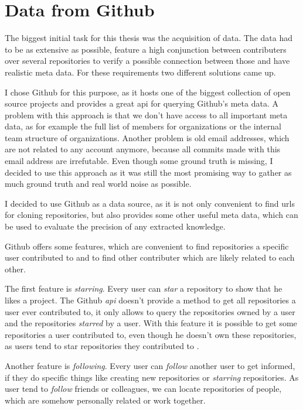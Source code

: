 \chapter{Data from Github}\label{github}
The biggest initial task for this thesis was the acquisition of data.
The data had to be as extensive as possible, feature a high conjunction between contributers over several repositories to verify a possible connection between those and have realistic meta data.
For these requirements two different solutions came up.


I chose Github for this purpose, as it hosts one of the biggest collection of open source projects and provides a great \ac{api} for querying Github's meta data.
A problem with this approach is that we don't have access to all important meta data, as for example the full list of members for organizations or the internal team structure of organizations.
Another problem is old email addresses, which are not related to any account anymore, because all commits made with this email address are irrefutable.
Even though some ground truth is missing, I decided to use this approach as it was still the most promising way to gather as much ground truth and real world noise as possible.


I decided to use Github as a data source, as it is not only convenient to find \acp{url} for cloning repositories, but also provides some other useful meta data, which can be used to evaluate the precision of any extracted knowledge.

Github offers some features, which are convenient to find repositories a specific user contributed to and to find other contributer which are likely related to each other.

The first feature is \emph{starring}. Every user can \emph{star} a repository to show that he likes a project.
The Github \emph{api} doesn't provide a method to get all repositories a user ever contributed to, it only allows to query the repositories owned by a user and the repositories \emph{starred} by a user.
With this feature it is possible to get some repositories a user contributed to, even though he doesn't own these repositories, as users tend to star repositories they contributed to .

Another feature is \emph{following}. Every user can \emph{follow} another user to get informed, if they do specific things like creating new repositories or \emph{starring} repositories.
As user tend to  \emph{follow} friends or colleagues, we can locate repositories of people, which are somehow personally related or work together.

